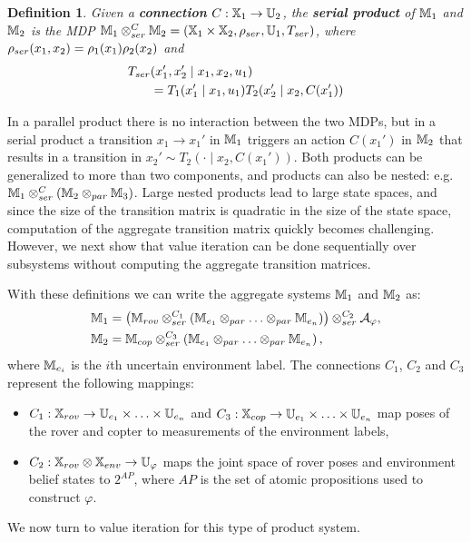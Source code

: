 \documentclass[conference]{IEEEtran}
\newtheorem{definition}{Definition}
\begin{document}
\begin{definition}
  Given a \textbf{connection} $C : \mathbb{X}_1 \rightarrow \mathbb{U}_2$, the \textbf{serial product} of $\mathbb{M}_1$ and $\mathbb{M}_2$ is the MDP $\mathbb{M}_1 \otimes_{ser}^C \mathbb{M}_2 = (\mathbb{X}_1 \times \mathbb{X}_2, \rho_{ser}, \mathbb{U}_1, T_{ser})$,
  where $\rho_{ser}(x_1, x_2) = \rho_1(x_1) \rho_2(x_2)$
  and
  \begin{equation}\label{eq:serial}
  \begin{aligned}
      \tr_{ser}&(x_1', x_2' \mid x_1, x_2, u_1) \\
      & = \tr_1 (x_1' \mid x_1, u_1) \tr_2 (x_2' \mid x_2, C(x_1') )
  \end{aligned}
  \end{equation}
\end{definition}
In a parallel product there is no interaction between the two MDPs, but in a serial product a transition $x_1 \rightarrow x_1'$ in $\mathbb{M}_1$ triggers an action $C(x_1')$ in $\mathbb{M}_2$ that results in a transition in $x_2' \sim T_2(\cdot \mid x_2, C(x_1'))$. Both products can be generalized to more than two components, and products can also be nested: e.g. $\mathbb{M}_1 \otimes_{ser}^C \left( \mathbb{M}_2 \otimes_{par} \mathbb{M}_3 \right)$. Large nested products lead to large state spaces, and since the size of the transition matrix is quadratic in the size of the state space, computation of the aggregate transition matrix quickly becomes challenging. However, we next show that value iteration can be done sequentially over subsystems without computing the aggregate transition matrices.

With these definitions we can write the aggregate systems $\mathbb{M}_1$ and $\mathbb{M}_2$ as:
\begin{equation}
\label{eq:syst_prod_def}
\begin{aligned}
	\MDP_1 & = \left( \MDP_{rov} \otimes_{ser}^{C_1} \left( \MDP_{e_1} \otimes_{par} \ldots \otimes_{par} \MDP_{e_n} \right) \right) \otimes_{ser}^{C_2} \mathcal A_{\varphi}, \\
	\MDP_2 & = \MDP_{cop} \otimes_{ser}^{C_3} \left( \MDP_{e_1} \otimes_{par} \ldots \otimes_{par} \MDP_{e_n} \right),
\end{aligned}
\end{equation}
where $\mathbb{M}_{e_i}$ is the $i$th uncertain environment label. The connections $C_1$, $C_2$ and $C_3$ represent the following mappings:
\begin{itemize}
	\item $C_1 : \mathbb{X}_{rov} \rightarrow \mathbb{U}_{e_1} \times \ldots \times \mathbb{U}_{e_n}$ and $C_3 : \mathbb{X}_{cop} \rightarrow \mathbb{U}_{e_1} \times \ldots \times \mathbb{U}_{e_n}$ map poses of the rover and copter to measurements of the environment labels,
	\item $C_2 : \mathbb{X}_{rov} \otimes \mathbb{X}_{env} \rightarrow \mathbb{U}_{\varphi}$ maps the joint space of rover poses and environment belief states to $2^{AP}$, where $AP$ is the set of atomic propositions used to construct $\varphi$.
\end{itemize}
We now turn to value iteration for this type of product system.
\end{document}
